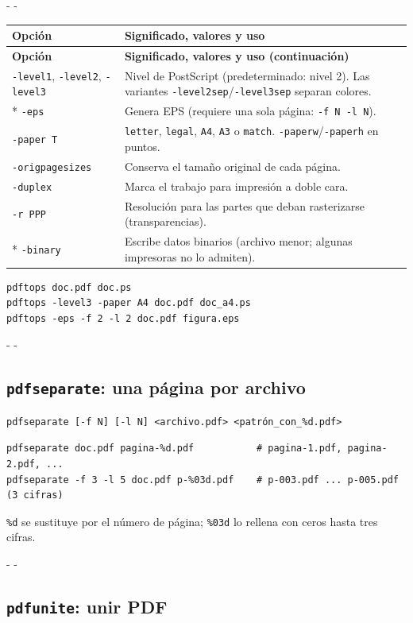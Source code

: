 \documentclass[11pt,a4paper]{article}
\makeatletter
\newcommand{\necesitaespacio}[1]{\par\penalty-100\begingroup
	\setlength{\dimen@}{#1}\dimen@ii\pagegoal\advance\dimen@ii-\pagetotal
	\ifdim\dimen@>\dimen@ii\ifdim\dimen@ii>\z@\vfil\fi\penalty-\@M\fi\endgroup}
\newenvironment{opciones}[1][Opción]{%
	\par\begingroup\small
	\begin{longtable}{L{4.25cm}L{11.2cm}}
		\toprule\rowcolor{tablacab}\cab{#1} & \cab{Significado, valores y uso} \\ \midrule
		\endfirsthead
		\toprule\rowcolor{tablacab}\cab{#1} & \cab{Significado, valores y uso (continuación)} \\ \midrule
		\endhead
		\bottomrule
		\endfoot}
	{\end{longtable}\endgroup}
\newcommand{\opt}[1]{\texttt{\textcolor{colopt}{#1}}}      %
\newcommand{\val}[1]{\texttt{#1}}                          %
\newcommand{\cab}[1]{\textbf{#1}}
\makeatother
\begin{document}
	\necesitaespacio{18\baselineskip}
	\begin{opciones}
		\opt{-level1}, \opt{-level2}, \opt{-level3} & Nivel de PostScript (predeterminado: nivel 2). Las variantes \opt{-level2sep}/\opt{-level3sep} separan colores.\\*
		\opt{-eps} & Genera EPS (requiere una sola página: \opt{-f N -l N}).\\
		\opt{-paper T} & \val{letter}, \val{legal}, \val{A4}, \val{A3} o \val{match}. \opt{-paperw}/\opt{-paperh} en puntos.\\
		\opt{-origpagesizes} & Conserva el tamaño original de cada página.\\
		\opt{-duplex} & Marca el trabajo para impresión a doble cara.\\
		\opt{-r PPP} & Resolución para las partes que deban rasterizarse (transparencias).\\*
		\opt{-binary} & Escribe datos binarios (archivo menor; algunas impresoras no lo admiten).\\
	\end{opciones}
	
	\begin{lstlisting}
pdftops doc.pdf doc.ps
pdftops -level3 -paper A4 doc.pdf doc_a4.ps
pdftops -eps -f 2 -l 2 doc.pdf figura.eps
\end{lstlisting}
	
	\necesitaespacio{8\baselineskip}
	\subsection{\texttt{pdfseparate}: una página por archivo}\label{sec:pdfseparate}
	
	\begin{lstlisting}[style=sintaxis]
pdfseparate [-f N] [-l N] <archivo.pdf> <patrón_con_%d.pdf>
\end{lstlisting}
	
	\begin{lstlisting}
pdfseparate doc.pdf pagina-%d.pdf           # pagina-1.pdf, pagina-2.pdf, ...
pdfseparate -f 3 -l 5 doc.pdf p-%03d.pdf    # p-003.pdf ... p-005.pdf (3 cifras)
\end{lstlisting}
	
	\verb|%d| se sustituye por el número de página; \verb|%03d| lo rellena con ceros hasta tres cifras.
	
	\necesitaespacio{8\baselineskip}
	\subsection{\texttt{pdfunite}: unir PDF}\label{sec:pdfunite}
	
\end{document}
